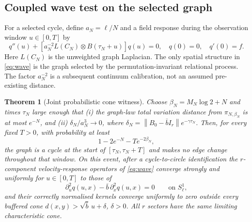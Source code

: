 \documentclass[11pt,a4paper]{article}
\numberwithin{equation}{section}
\newtheorem{theorem}{Theorem}[section]
\newcommand{\barb}{\bar b}
\newcommand{\norm}[1]{\left\lVert#1\right\rVert}
\newcommand{\1}{\mathbf{1}}
\begin{document}
\subsection{Coupled wave test on the selected graph}
For a selected cycle, define $a_N=\ell/N$ and a field response during the observation window $u\in[0,T]$ by
\begin{equation}\label{eq:wave}
 q''(u)+\left[a_N^{-2}L(C_N)\otimes B(\tau_N+u)\right]q(u)=0,
 \quad q(0)=0,\quad q'(0)=f.
\end{equation}
Here $L(C_N)$ is the unweighted graph Laplacian. The only spatial structure in \eqref{eq:wave} is the graph selected by the permutation-invariant relational process. The factor $a_N^{-2}$ is a subsequent continuum calibration, not an assumed pre-existing distance.
\begin{theorem}[Joint probabilistic cone witness]\label{thm:cone}
Choose $\beta_N=M_N\log2+N$ and times $\tau_N$ large enough that (i) the graph-law total variation distance from $\pi_{N,\beta_N}$ is at most $e^{-N}$, and (ii) $\delta_N/a_N^3\to0$, where $\delta_N=\norm{B_0-\barb I_r}e^{-\gamma\tau_N}$. Then, for every fixed $T>0$, with probability at least
\begin{equation}\label{eq:probability}
 1-2e^{-N}-Te^{-2\beta_N},
\end{equation}
the graph is a cycle at the start of $[\tau_N,\tau_N+T]$ and makes no edge change throughout that window. On this event, after a cycle-to-circle identification the $r$-component velocity-response operators of \eqref{eq:wave} converge strongly and uniformly for $u\in[0,T]$ to those of
\begin{equation}\label{eq:continuum}
 \partial_u^2q(u,x)-\barb\,\partial_x^2q(u,x)=0
 \qquad\text{on }S^1_\ell,
\end{equation}
and their correctly normalised kernels converge uniformly to zero outside every buffered cone $d(x,y)>\sqrt{\barb}\,u+\delta$, $\delta>0$. All $r$ sectors have the same limiting characteristic cone.
\end{theorem}
\end{document}

